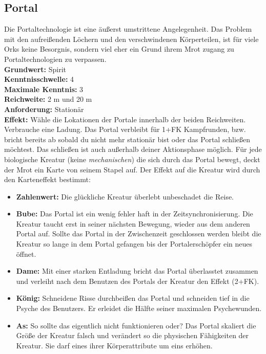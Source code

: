 \subsection*{Portal} \label{sk:portal}
Die Portaltechnologie ist eine äußerst umstrittene Angelegenheit. Das Problem mit den aufreißenden Löchern und den verschwindenen Körperteilen, ist für viele Orks keine Besorgnis, sondern viel eher ein Grund ihrem Mrot zugang zu Portaltechnologien zu verpassen. \\
\textbf{Grundwert:} Spirit \\
\textbf{Kenntnisschwelle:} 4 \\
\textbf{Maximale Kenntnis:} 3 \\
\textbf{Reichweite:} 2 m und 20 m \\
\textbf{Anforderung:} Stationär\\
\textbf{Effekt:} Wähle die Lokationen der Portale innerhalb der beiden Reichweiten. Verbrauche eine Ladung. Das Portal verbleibt für 1+FK Kampfrunden, bzw. bricht bereits ab sobald du nicht mehr stationär bist oder das Portal schließen möchtest. Das schließen ist auch außerhalb deiner Aktionsphase möglich. Für jede biologische Kreatur (keine \textit{mechanischen}) die sich durch das Portal bewegt, deckt der Mrot ein Karte von seinem Stapel auf. Der Effekt auf die Kreatur wird durch den Karteneffekt bestimmt:
\begin{itemize}
    \item \textbf{Zahlenwert:} Die glückliche Kreatur überlebt unbeschadet die Reise.
    \item \textbf{Bube:} Das Portal ist ein wenig fehler haft in der Zeitsynchronisierung. Die Kreatur taucht erst in seiner nächsten Bewegung, wieder aus dem anderen Portal auf. Sollte das Portal in der Zwischenzeit geschlossen werden bleibt die Kreatur so lange in dem Portal gefangen bis der Portalerschöpfer ein neues öffnet.\\
    \item \textbf{Dame:} Mit einer starken Entladung bricht das Portal überlasstet zusammen und verleiht nach dem Benutzen des Portals der Kreatur den Effekt \textit{} (2+FK).
    \item \textbf{König:} Schneidene Risse durchbeißen das Portal und schneiden tief in die Psyche des Benutzers. Er erleidet die Hälfte seiner maximalen Psychewunden.
    \item \textbf{As:} So sollte das eigentlich nicht funktionieren oder? Das Portal skaliert die Größe der Kreatur falsch und verändert so die physischen Fähigkeiten der Kreatur. Sie darf eines ihrer Körperattribute um eins erhöhen.
\end{itemize}


